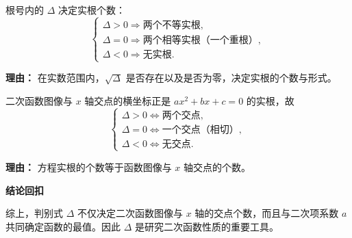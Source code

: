 \begin{proofbox}
\begin{description}[style=nextline, leftmargin=2.8em, labelsep=0.5em, itemsep=0.55em]
		\item[\textbf{步骤五（判别式与根）：}]
		      根号内的 $\Delta$ 决定实根个数：
		      \[
			      \begin{cases}
				      \Delta>0 \Longrightarrow \text{两个不等实根},       \\
				      \Delta=0 \Longrightarrow \text{两个相等实根（一个重根）}, \\
				      \Delta<0 \Longrightarrow \text{无实根}.
			      \end{cases}
		      \]
		      \par\textbf{理由：} 在实数范围内，$\sqrt{\Delta}$ 是否存在以及是否为零，决定实根的个数与形式。

		\item[\textbf{步骤六（对应交点）：}]
		      二次函数图像与 $x$ 轴交点的横坐标正是 $ax^2+bx+c=0$ 的实根，故
		      \[
			      \begin{cases}
				      \Delta>0 \iff \text{两个交点},     \\
				      \Delta=0 \iff \text{一个交点（相切）}, \\
				      \Delta<0 \iff \text{无交点}.
			      \end{cases}
		      \]
		      \par\textbf{理由：} 方程实根的个数等于函数图像与 $x$ 轴交点的个数。
	\end{description}

	\medskip
	\textbf{\textcolor{CProof}{结论回扣}}

	综上，判别式 $\Delta$ 不仅决定二次函数图像与 $x$ 轴的交点个数，而且与二次项系数 $a$ 共同确定函数的最值。因此 $\Delta$ 是研究二次函数性质的重要工具。
\end{proofbox}